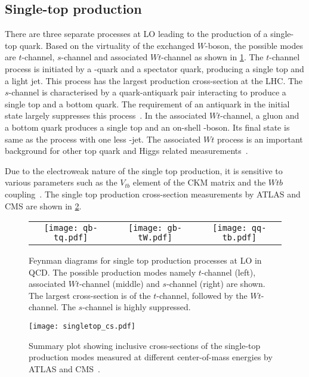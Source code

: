 \subsection*{Single-top production}
There are three separate processes at LO leading to the production of a single-top quark.
Based on the virtuality of the exchanged $W$-boson, the possible modes
are $t$-channel, $s$-channel and associated $Wt$-channel as shown in \cref{fig:topprod}.
The $t$-channel process is initiated by a \Pbottom-quark and a spectator quark, producing 
a single top and a light jet. This process has the largest production cross-section at the LHC.
The $s$-channel is characterised by a quark-antiquark pair interacting to produce
a single top and a bottom quark. The requirement of an antiquark in the initial state largely
suppresses this process~\cite{Cristinziani_2017}. In the associated $Wt$-channel,
a gluon and a bottom quark produces a single top and an on-shell \PW-boson. Its final state is 
same as the \ttbar process with one less \Pbottom-jet. The associated $Wt$ process is an 
important background for other top quark and Higgs related measurements~\cite{ATLAS:2024ppp}.

Due to the electroweak
nature of the single top production, it is sensitive to various parameters such as 
the $V_{tb}$ element of the CKM matrix and the $Wtb$ coupling~\cite{Andrea:2023yap}. The 
single top production cross-section measurements by ATLAS and CMS are shown in \cref{fig:singletop_cs}.

\begin{figure}[htbp]
    \centering
    \begin{tabular}{ccc}
      \texttt{[image: qb-tq.pdf]} &
      \texttt{[image: gb-tW.pdf]} &
      \texttt{[image: qq-tb.pdf]} \\[1ex]
    \end{tabular}
    \caption[Feynman diagrams for single-top production processes at LO in QCD]{Feynman diagrams
    for single top production processes at LO in QCD. The possible production modes namely
    $t$-channel (left), associated $Wt$-channel (middle) and $s$-channel (right) are shown. The
    largest cross-section is of the $t$-channel, followed by the $Wt$-channel. The $s$-channel
    is highly suppressed.}
    \label{fig:topprod}
  \end{figure}
  
\begin{figure}[htbp]
    \centering
    \texttt{[image: singletop\_cs.pdf]}
    \caption[Cross-section of the single top production]{Summary plot showing inclusive cross-sections
    of the single-top production modes measured at different center-of-mass energies by ATLAS
    and CMS~\cite{ATL-PHYS-PUB-2024-006}.}%
    \label{fig:singletop_cs}
\end{figure}

